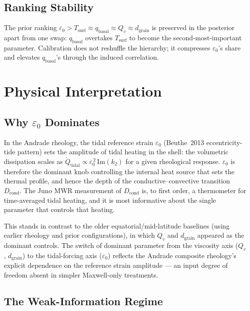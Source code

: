 \documentclass[11pt,a4paper]{article}
\begin{document}
\subsection{Ranking Stability}

The prior ranking
$\varepsilon_0 > T_\mathrm{surf} \approx q_\mathrm{basal} \approx Q_v \approx d_\mathrm{grain}$
is preserved in the posterior apart from one swap: $q_\mathrm{basal}$ overtakes
$T_\mathrm{surf}$ to become the second-most-important parameter.  Calibration
does not reshuffle the hierarchy; it compresses $\varepsilon_0$'s share and
elevates $q_\mathrm{basal}$'s through the induced correlation.

\section{Physical Interpretation}

\subsection{Why $\varepsilon_0$ Dominates}

In the Andrade rheology, the tidal reference strain $\varepsilon_0$
(Beuthe~2013 eccentricity-tide pattern) sets the amplitude of tidal heating
in the shell: the volumetric dissipation scales as
$\dot{Q}_\mathrm{tidal} \propto \varepsilon_0^{\,2}\,\mathrm{Im}(k_2)$ for a given
rheological response.  $\varepsilon_0$ is therefore the dominant knob controlling
the internal heat source that sets the thermal profile, and hence the depth of
the conductive--convective transition $D_\mathrm{cond}$.  The Juno MWR
measurement of $D_\mathrm{cond}$ is, to first order, a thermometer for
time-averaged tidal heating, and it is most informative about the single
parameter that controls that heating.

This stands in contrast to the older equatorial/mid-latitude baselines
(using earlier rheology and prior configurations), in which $Q_v$ and
$d_\mathrm{grain}$ appeared as the dominant controls.  The switch of dominant
parameter from the viscosity axis ($Q_v$, $d_\mathrm{grain}$) to the
tidal-forcing axis ($\varepsilon_0$) reflects the Andrade composite
rheology's explicit dependence on the reference strain amplitude --- an input
degree of freedom absent in simpler Maxwell-only treatments.

\subsection{The Weak-Information Regime}
\end{document}

